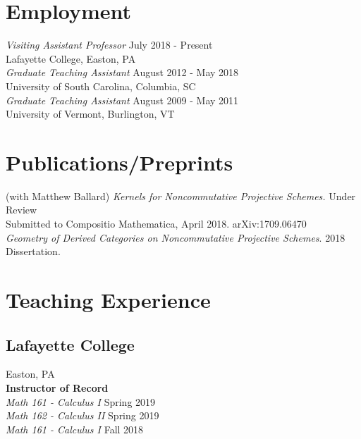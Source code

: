 \documentclass{article}
\begin{document}
\section*{Employment}
\textsl{Visiting Assistant Professor} \hfill July 2018 - Present\\
Lafayette College, Easton, PA\\

\noindent \textsl{Graduate Teaching Assistant} \hfill August 2012 - May 2018 \\
University of South Carolina, Columbia, SC\\

\noindent\textsl{Graduate Teaching Assistant} \hfill August 2009 - May 2011 \\
University of Vermont, Burlington, VT


\newpage

\section*{Publications/Preprints}
(with Matthew Ballard) \textsl{Kernels for Noncommutative Projective Schemes.} 
\hfill Under Review\\
Submitted to Compositio Mathematica, April 2018.  arXiv:1709.06470\\

\noindent\textsl{Geometry of Derived Categories on Noncommutative Projective Schemes}.  \hfill 2018\\
Dissertation.

\section*{Teaching Experience}
\subsection*{Lafayette College}
\noindent Easton, PA\\

\noindent\textbf{Instructor of Record}\\
\textsl{Math 161 - Calculus I} \hfill Spring 2019\\
\textsl{Math 162 - Calculus II} \hfill Spring 2019\\
\textsl{Math 161 - Calculus I} \hfill Fall 2018
\end{document}
